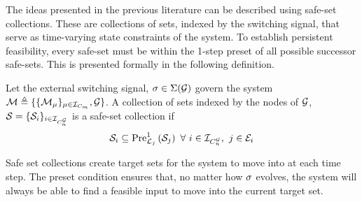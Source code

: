 The ideas presented in the previous literature can be described using safe-set collections. These are collections of sets, indexed by the switching signal, that serve as time-varying state constraints of the system. To establish persistent feasibility, every safe-set must be within the 1-step preset of all possible successor safe-sets. This is presented formally in the following definition.
\begin{definition}
Let the external switching signal, $\ss\in\Sigma(\graph)$ govern the system $\modes\triangleq\{\{\mode{\modeidx}\}_{\modeidx\in\idxset{\nummodes}}, \graph\}$. A collection of sets indexed by the nodes of $\graph$, $\mathcal{S}=\{\mathcal{S}_{i}\}_{i\in\idxset{\gnumnodes}}$ is a safe-set collection if
$$\mathcal{S}_{i}\subseteq\Pre[\gnodelabel{j}][1]{\mathcal{S}_{j}}\ \forall\ i\in\idxset{\gnumnodes},\ j\in \gnodeedges{i}$$
\end{definition}
Safe set collections create target sets for the system to move into at each time step. The preset condition ensures that, no matter how $\ss$ evolves, the system will always be able to find a feasible input to move into the current target set.
